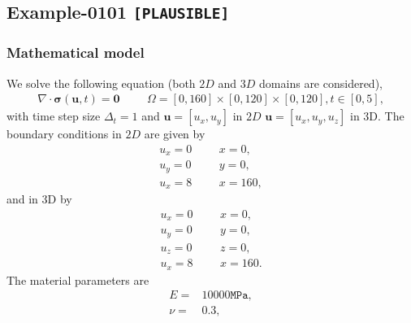 %
\clearpage
%
\subsection{Example-0101 \texttt{[PLAUSIBLE]}}
%
%
\subsubsection{Mathematical model}
%
We solve the following equation (both $2D$ and $3D$ domains are considered),
%
\begin{align}
    \nabla \cdot \boldsymbol{\sigma} (\boldsymbol{u}, t) = \boldsymbol{0} & &&\Omega = [0, 160] \times [0, 120] \times [0, 120], t \in [0, 5],
\end{align}
%
with time step size $\Delta_t = 1$ and $\boldsymbol{u} = [u_x,u_y]$ in $2D$ $\boldsymbol{u} = [u_x,u_y,u_z]$ in 3D. The boundary conditions in $2D$ are given by
%
\begin{align}
    u_x = 0 & &&x = 0, \\
    u_y = 0 & &&y = 0, \\
		u_x = 8 & &&x = 160,
\end{align}
%
and in 3D by
%
\begin{align}
    u_x = 0 & &&x = 0, \\
    u_y = 0 & &&y = 0, \\
    u_z = 0 & &&z = 0, \\
		u_x = 8 & &&x = 160.
\end{align}
%
The material parameters are
%
\begin{align}
    E = & 10000\texttt{MPa}, \\
    \nu = & 0.3, \\
\end{align}
%
%
